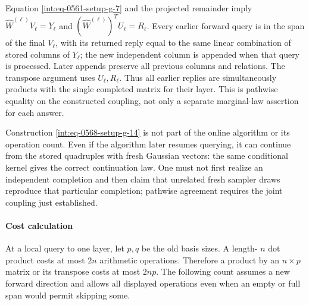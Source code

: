 
Equation \hyperref[int:eq-setup-g-7]{\eqref{int:eq-0561-setup-g-7}} and the projected remainder imply \(\widehat W^{(\ell)}V_\ell=Y_\ell\) and \((\widehat W^{(\ell)})^TU_\ell=R_\ell\). Every earlier forward query is in the span of the final \(V_\ell\), with its returned reply equal to the same linear combination of stored columns of \(Y_\ell\); the new independent column is appended when that query is processed. Later appends preserve all previous columns and relations. The transpose argument uses \(U_\ell,\allowbreak R_\ell\). Thus all earlier replies are simultaneously products with the single completed matrix for their layer. This is pathwise equality on the constructed coupling, not only a separate marginal-law assertion for each answer.



Construction \hyperref[int:eq-setup-g-14]{\eqref{int:eq-0568-setup-g-14}} is not part of the online algorithm or its operation count. Even if the algorithm later resumes querying, it can continue from the stored quadruples with fresh Gaussian vectors: the same conditional kernel gives the correct continuation law. One must not first realize an independent completion and then claim that unrelated fresh sampler draws reproduce that particular completion; pathwise agreement requires the joint coupling just established.


\paragraph{Cost calculation}
\label{int:setup-sampler-6}
\mbox{}\par\smallskip


At a local query to one layer, let \(p,\allowbreak q\) be the old basis sizes. A length- \(n\) dot product costs at most \(2n\) arithmetic operations. Therefore a product by an \(n\times p\) matrix or its transpose costs at most \(2np\). The following count assumes a new forward direction and allows all displayed operations even when an empty or full span would permit skipping some.


